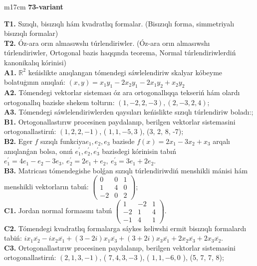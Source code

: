 \documentclass{article}
\begin{document}
\begin{tabular}{m{17cm}}
\textbf{73-variant}
\newline

\textbf{T1.} Sızıqlı, bisızıqlı hám kvadratlıq formalar. (Bisızıqlı forma,  simmetriyalı bisızıqlı formalar)  \\
\textbf{T2.} Óz-ara orın almasıwshı túrlendiriwler. (Óz-ara orın almasıwshı túrlendiriwler,  Ortogonal bazis haqqında teorema,  Normal túrlendiriwlerdiń kanonikalıq kórinisi) \\
\textbf{A1.} \(\mathbb{R}^{2}\) keńislikte anıqlangan tómendegi sáwlelendiriw skalyar kóbeyme bolatuģının anıqlań: \((x,y) = x_{1}y_{1} - 2x_{2}y_{1} - 2x_{1}y_{2} + x_{2}y_{2}\) \\
\textbf{A2.} Tómendegi vektorlar sisteması óz ara ortogonallıqqa tekseriń hám olardı ortogonallıq baziske shekem toltırın: \((1, - 2,2, - 3),(2, - 3,2,4)\); \\
\textbf{A3.} Tómendegi sáwlelendiriwlerden qaysıları keńislikte sızıqlı túrlendiriw boladı:; \\
\textbf{B1.} Ortogonallastırıw procesinen paydalanıp, berilgen vektorlar sistemasini ortogonallastirıń: \((1,2,2, - 1)\), ( \(1,1, - 5,3\) ), (3, 2, 8, -7); \\
\textbf{B2.} Eger \(f\) sızıqlı funkciya\(e_{1},e_{2},e_{3}\) bazisde \(f(x) = 2x_{1} - 3x_{2} + x_{3}\) arqalı anıqlanǵan bolsa, onıń \(e_{1}^{'},e_{2}^{'},e_{3}^{'}\) bazisdegi kórinisin tabıń\(e_{1}^{'} = 4e_{1} - e_{2} - 3e_{3},\ e_{2}^{'} = 2e_{1} + e_{2},\ e_{3}^{'} = 3e_{1} + 2e_{2}\). \\
\textbf{B3.} Matricası tómendegishe bolǵan sızıqlı túrlendiriwdiń menshikli mánisi hám menshikli vektorların tabıń: \(\begin{pmatrix} 0 & 0 & 1 \\ 1 & 4 & 0 \\  - 2 & 0 & 2 \end{pmatrix}\); \\
\textbf{C1.} Jordan normal formasını tabıń \(\begin{pmatrix} 1 & - 2 & 1 \\  - 2 & 1 & 4 \\  - 1 & 4 & 1 \end{pmatrix}\). \\
\textbf{C2.} Tómendegi kvadratlıq formalarga sáykes keliwshi ermit bisızıqlı formalardı tabiń: \(ix_{1}\overline{x_{2}} - ix_{2}\overline{x_{1}} + (3 - 2i)x_{1}\overline{x_{3}} + (3 + 2i)x_{3}\overline{x_{1}} + 2x_{2}\overline{x_{3}} + 2x_{3}\overline{x_{2}}\). \\
\textbf{C3.} Ortogonallastırıw procesinen paydalanıp, berilgen vektorlar sistemasini ortogonallastirıń: \((2,1,3, - 1)\), ( \(7,4,3, - 3\) ), ( \(1,1, - 6,0\) ), (5, 7, 7, 8); \\

\end{tabular}
\vspace{1cm}
\end{document}
